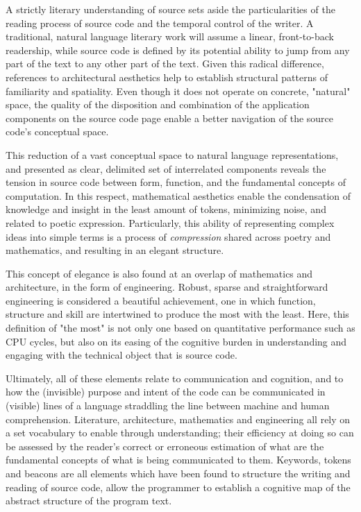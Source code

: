 A strictly literary understanding of source sets aside the particularities of the reading process of source code and the temporal control of the writer. A traditional, natural language literary work will assume a linear, front-to-back readership, while source code is defined by its potential ability to jump from any part of the text to any other part of the text. Given this radical difference, references to architectural aesthetics help to establish structural patterns of familiarity and spatiality. Even though it does not operate on concrete, "natural" space, the quality of the disposition and combination of the application components on the source code page enable a better navigation of the source code's conceptual space.

This reduction of a vast conceptual space to natural language representations, and presented as clear, delimited set of interrelated components reveals the tension in source code between form, function, and the fundamental concepts of computation. In this respect, mathematical aesthetics enable the condensation of knowledge and insight in the least amount of tokens, minimizing noise, and related to poetic expression. Particularly, this ability of representing complex ideas into simple terms is a process of \emph{compression} shared across poetry and mathematics, and resulting in an elegant structure.

This concept of elegance is also found at an overlap of mathematics and architecture, in the form of engineering. Robust, sparse and straightforward engineering is considered a beautiful achievement, one in which function, structure and skill are intertwined to produce the most with the least. Here, this definition of "the most" is not only one based on quantitative performance such as CPU cycles, but also on its easing of the cognitive burden in understanding and engaging with the technical object that is source code.

Ultimately, all of these elements relate to communication and cognition, and to how the (invisible) purpose and intent of the code can be communicated in (visible) lines of a language straddling the line between machine and human comprehension. Literature, architecture, mathematics and engineering all rely on a set vocabulary to enable through understanding; their efficiency at doing so can be assessed by the reader's correct or erroneous estimation of what are the fundamental concepts of what is being communicated to them. Keywords, tokens and beacons are all elements which have been found to structure the writing and reading of source code, allow the programmer to establish a cognitive map of the abstract structure of the program text.

